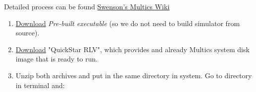 Detailed process can be found \href{http://multics-wiki.swenson.org/index.php/Main_Page}{Swenson's Multics Wiki} \cite{setupRingZero}

\begin{enumerate}
    \item \href{http://ringzero.wikidot.com/r2-0-load-and-go}{Download} \textit{Pre-built executable} (so we do not need to build simulator from source).
    \item \href{https://s3.amazonaws.com/eswenson-multics/public/releases/MR12.6f/QuickStart_MR12.6f.zip}{Download} "QuickStar RLV", which provides and already Multics system disk image that is ready to run.
    \item Unzip both archives and put in the same directory in system. Go to directory in terminal and:
\end{enumerate}

